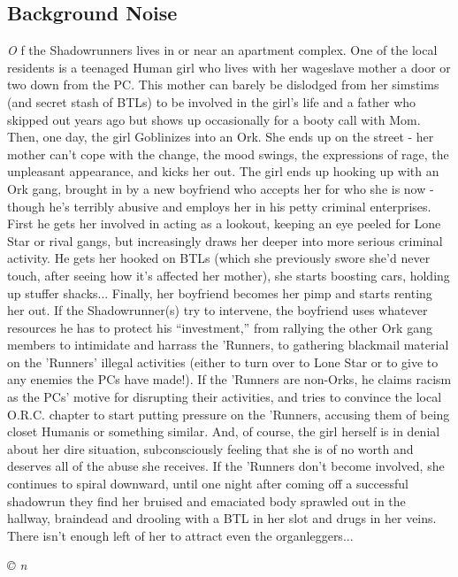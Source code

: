 \documentclass[letterpaper,onecolumn,10pt]{article}
\renewcommand{\textsc}[1]{{\fontspec{Friz Quadrata SC TT}\selectfont #1}}
\newcommand{\getyear}[1]{\StrLeft{#1}{4}}
\newenvironment{scenario}[6]
	{
		\section[#1 {\small\textsc{[#2]}}]{#1} \nopagebreak

		\noindent{\textsc{#2}}\nopagebreak

		\noindent\textit{#3}\nopagebreak
		\def\TMPSCENARIO{{\small\textit{©\getyear{#5}{} #4}}}
	}
	{\TMPSCENARIO}
\newcommand{\synopsis}{\textbf{Synopsis: }}
\begin{document}
\begin{multicols}{2}
\begin{scenario}{Background Noise}
\synopsis One of the Shadowrunners lives in or near an apartment complex. One of the local residents is a teenaged Human girl who lives with her wageslave mother a door or two down from the PC. This mother can barely be dislodged from her simstims (and secret stash of BTLs) to be involved in the girl's life and a father who skipped out years ago but shows up occasionally for a booty call with Mom. Then, one day, the girl Goblinizes into an Ork. She ends up on the street - her mother can't cope with the change, the mood swings, the expressions of rage, the unpleasant appearance, and kicks her out. The girl ends up hooking up with an Ork gang, brought in by a new boyfriend who accepts her for who she is now - though he's terribly abusive and employs her in his petty criminal enterprises. First he gets her involved in acting as a lookout, keeping an eye peeled for Lone Star or rival gangs, but increasingly draws her deeper into more serious criminal activity. He gets her hooked on BTLs (which she previously swore she'd never touch, after seeing how it's affected her mother), she starts boosting cars, holding up stuffer shacks... Finally, her boyfriend becomes her pimp and starts renting her out. If the Shadowrunner(s) try to intervene, the boyfriend uses whatever resources he has to protect his ``investment,'' from rallying the other Ork gang members to intimidate and harrass the 'Runners, to gathering blackmail material on the 'Runners' illegal activities (either to turn over to Lone Star or to give to any enemies the PCs have made!). If the 'Runners are non-Orks, he claims racism as the PCs' motive for disrupting their activities, and tries to convince the local O.R.C. chapter to start putting pressure on the 'Runners, accusing them of being closet Humanis or something similar. And, of course, the girl herself is in denial about her dire situation, subconsciously feeling that she is of no worth and deserves all of the abuse she receives. If the 'Runners don't become involved, she continues to spiral downward, until one night after coming off a successful shadowrun they find her bruised and emaciated body sprawled out in the hallway, braindead and drooling with a BTL in her slot and drugs in her veins. There isn't enough left of her to attract even the organleggers...


\end{scenario}
\end{multicols}
\end{document}
